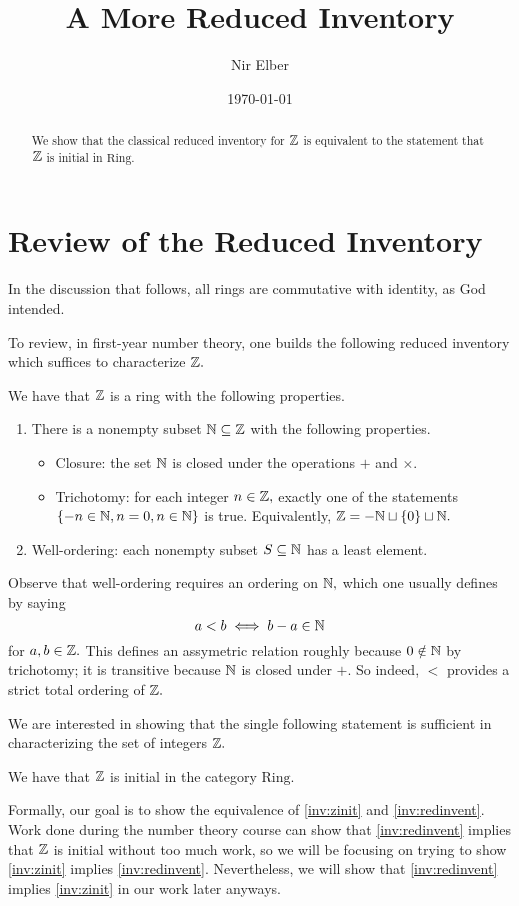 \documentclass{article}
\title{A More Reduced Inventory}
\author{Nir Elber}
\date{\today}
\begin{document}
\maketitle

\begin{abstract}
	We show that the classical reduced inventory for $\mathbb Z$ is equivalent to the statement that $\mathbb Z$ is initial in $\mathrm{Ring}.$
\end{abstract}

\toctrue
\tableofcontents
\tocfalse

\newpage

\section{Review of the Reduced Inventory}
In the discussion that follows, all rings are commutative with identity, as God intended.

To review, in first-year number theory, one builds the following reduced inventory which suffices to characterize $\mathbb Z.$
\begin{inv} \label{inv:redinvent}
	We have that $\mathbb Z$ is a ring with the following properties.
	\begin{enumerate}
		\item There is a nonempty subset $\mathbb N\subseteq\mathbb Z$ with the following properties.
		\begin{itemize}
			\item Closure: the set $\mathbb N$ is closed under the operations $+$ and $\times.$
			\item Trichotomy: for each integer $n\in\mathbb Z,$ exactly one of the statements $\{-n\in\mathbb N,n=0,n\in\mathbb N\}$ is true. Equivalently, $\mathbb Z=-\mathbb N\sqcup\{0\}\sqcup\mathbb N.$
		\end{itemize}
		\item Well-ordering: each nonempty subset $S\subseteq\mathbb N$ has a least element.
	\end{enumerate}
\end{inv}
Observe that well-ordering requires an ordering on $\mathbb N,$ which one usually defines by saying
\[a<b\iff b-a\in\mathbb N\]
for $a,b\in\mathbb Z.$ This defines an assymetric relation roughly because $0\notin\mathbb N$ by trichotomy; it is transitive because $\mathbb N$ is closed under $+.$ So indeed, $<$ provides a strict total ordering of $\mathbb Z.$

We are interested in showing that the single following statement is sufficient in characterizing the set of integers $\mathbb Z.$
\begin{inv} \label{inv:zinit}
	We have that $\mathbb Z$ is initial in the category $\mathrm{Ring}.$
\end{inv}
Formally, our goal is to show the equivalence of \autoref{inv:zinit} and \autoref{inv:redinvent}. Work done during the number theory course can show that \autoref{inv:redinvent} implies that $\mathbb Z$ is initial without too much work, so we will be focusing on trying to show \autoref{inv:zinit} implies \autoref{inv:redinvent}. Nevertheless, we will show that \autoref{inv:redinvent} implies \autoref{inv:zinit} in our work later anyways.
\end{document}
